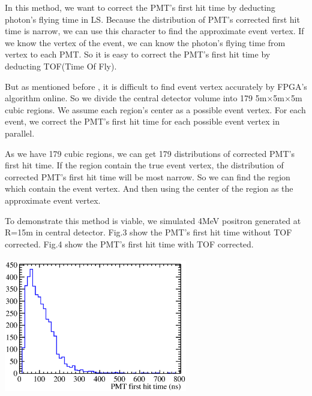 \documentclass[a4paper,10pt,twoside]{paper_1}
\begin{document}
\begin{multicols}{2}
		In this method, we want to correct the PMT's first
		hit time by deducting photon's flying time in LS. 
		Because the distribution of PMT's corrected first hit time
		is narrow, we can use this character to find the approximate event vertex. 
		If we know the vertex of the event, we can know the photon's flying time from vertex to each
		PMT.
		So it is easy to correct the PMT's first hit time
		by deducting TOF(Time Of Fly).

		But as mentioned before , it is difficult to find event
		vertex accurately by FPGA's algorithm online. So we
		divide the central detector volume into 179 5m$\times$5m$\times$5m
		cubic regions. We assume each region's center as a possible event vertex.
		For each event, we correct the PMT's 
		first hit time for each possible event vertex in parallel.


		As we have 179 cubic regions, we can get 179 distributions of corrected 
		PMT's first hit time. 
		If the region contain the true event vertex, 
		the distribution of corrected PMT's first hit time 
		will be most narrow.
		So we can find the region which contain the event vertex. 
		And then using the center of the region as the approximate
		event vertex.

		To demonstrate this method is viable, we simulated 4MeV 
		positron generated at R=15m in central detector. 
		Fig.3 show the PMT's first hit time without TOF corrected.
		Fig.4 show the PMT's first hit time with TOF corrected.


		\begin{center}
			\includegraphics[width=8cm,height=6cm]{4MeV_e+_PMT_first_hitTime.eps}
		\end{center}



\end{multicols}
\end{document}
